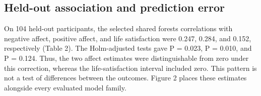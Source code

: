 \documentclass[11pt,letterpaper]{article}
\begin{document}
\subsection{Held-out association and prediction error}\label{held-out-association-and-prediction-error}

On 104 held-out participants, the selected shared forest\textquotesingle s correlations with negative affect, positive affect, and life satisfaction were 0.247, 0.284, and 0.152, respectively (Table 2). The Holm-adjusted tests gave P = 0.023, P = 0.010, and P = 0.124. Thus, the two affect estimates were distinguishable from zero under this correction, whereas the life-satisfaction interval included zero. This pattern is not a test of differences between the outcomes. Figure 2 places these estimates alongside every evaluated model family.
\end{document}
